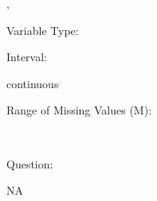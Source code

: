 \documentclass[
]{article}
\begin{document}
,

\begin{minipage}[t]{0.3\linewidth}

\colorbox{mypink1}{}

\end{minipage}%
\begin{minipage}[t]{0.7\linewidth}

\colorbox{mypink1}{\makebox[\textwidth]{\strut\bfseries\color{black}  
 }}

\end{minipage}

\begin{minipage}[t]{0.3\linewidth}

Variable Type:

\end{minipage}%
\begin{minipage}[t]{0.7\linewidth}

\end{minipage}

\begin{minipage}[t]{0.3\linewidth}

Interval:

\end{minipage}%
\begin{minipage}[t]{0.7\linewidth}

continuous

\end{minipage}

\begin{minipage}[t]{0.3\linewidth}

Range of Missing Values (M):

\end{minipage}%
\begin{minipage}[t]{0.7\linewidth}

~

\end{minipage}

\begin{minipage}[t]{0.3\linewidth}

Question:

\end{minipage}%
\begin{minipage}[t]{0.7\linewidth}

NA

\end{minipage}
\end{document}
